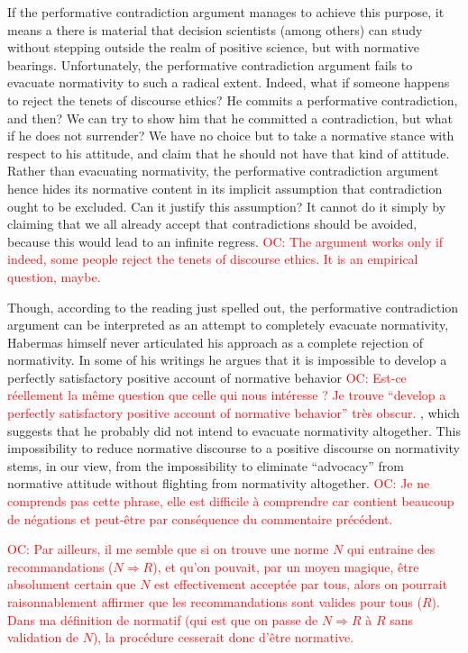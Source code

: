 \documentclass[preprint, french, english, 11pt]{elsarticle}%
\newcommand{\commentOC}[1]{\textcolor{red}{OC: #1}}
\begin{document}
If the performative contradiction argument manages to achieve this purpose, it means a there is material that decision scientists (among others) can study without stepping outside the realm of positive science, but with normative bearings. Unfortunately, the performative contradiction argument fails to evacuate normativity to such a radical extent. Indeed, what if someone happens to reject the tenets of discourse ethics? He commits a performative contradiction, and then? We can try to show him that he committed a contradiction, but what if he does not surrender? We have no choice but to take a normative stance with respect to his attitude, and claim that he should not have that kind of attitude. Rather than evacuating normativity, the performative contradiction argument hence hides its normative content in its implicit assumption that contradiction ought to be excluded. Can it justify this assumption? It cannot do it simply by claiming that we all already accept that contradictions should be avoided, because this would lead to an infinite regress.
\commentOC{The argument works only if indeed, some people reject the tenets of discourse ethics. It is an empirical question, maybe.}

Though, according to the reading just spelled out, the performative contradiction argument can be interpreted as an attempt to completely evacuate normativity, Habermas himself never articulated his approach as a complete rejection of normativity. In some of his writings he argues that it is impossible to develop a perfectly satisfactory positive account of normative behavior
\commentOC{Est-ce réellement la même question que celle qui nous intéresse ? Je trouve “develop a perfectly satisfactory positive account of normative behavior” très obscur.}%
, which suggests that he probably did not intend to evacuate normativity altogether. This impossibility to reduce normative discourse to a positive discourse on normativity stems, in our view, from the impossibility to eliminate ``advocacy'' from normative attitude without flighting from normativity altogether. 
\commentOC{Je ne comprends pas cette phrase, elle est difficile à comprendre car contient beaucoup de négations et peut-être par conséquence du commentaire précédent.} 

\commentOC{Par ailleurs, il me semble que si on trouve une norme $N$ qui entraine des recommandations ($N ⇒ R$), et qu’on pouvait, par un moyen magique, être absolument certain que $N$ est effectivement acceptée par tous, alors on pourrait raisonnablement affirmer que les recommandations sont valides pour tous ($R$). Dans ma définition de normatif (qui est que on passe de $N ⇒ R$ à $R$ sans validation de $N$), la procédure cesserait donc d’être normative.}
\end{document}
